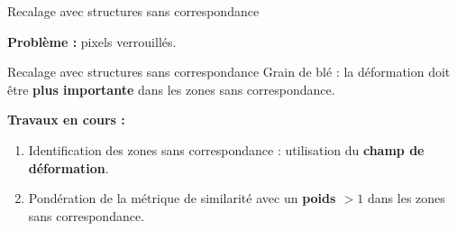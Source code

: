 \documentclass[10pt]{beamer}
\begin{document}
\begin{frame}{Recalage avec structures sans correspondance}
\begin{figure}[ht]
\begin{subfigure}[t]{0.33\textwidth}
      \caption{}
      \label{subfig:slice_overlay_0weight}
    \end{subfigure}%

  \end{figure}

  \textbf{Problème :} pixels verrouillés.

\end{frame}


\begin{frame}{Recalage avec structures sans correspondance}
  Grain de blé : la déformation doit être \textbf{plus importante}
  dans les zones sans correspondance.

  \textbf{Travaux en cours :}

  \begin{enumerate}
  \item Identification des zones sans correspondance : utilisation du
    \textbf{champ de déformation}.
  \item Pondération de la métrique de similarité avec un \textbf{poids
      $> 1$} dans les zones sans correspondance.
  \end{enumerate}


\end{frame}
\end{document}
